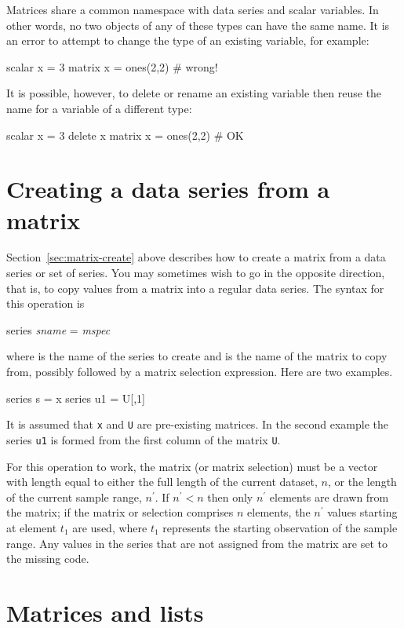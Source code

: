 Matrices share a common namespace with data series and scalar
variables.  In other words, no two objects of any of these types can
have the same name.  It is an error to attempt to change the type of
an existing variable, for example:
%
\begin{code}
scalar x = 3
matrix x = ones(2,2) # wrong!
\end{code}
%
It is possible, however, to delete or rename an existing variable then
reuse the name for a variable of a different type:
\begin{code}
scalar x = 3
delete x
matrix x = ones(2,2) # OK
\end{code}


\section{Creating a data series from a matrix}
\label{matrix-create-series}

Section~\ref{sec:matrix-create} above describes how to create a matrix
from a data series or set of series.  You may sometimes wish to go in
the opposite direction, that is, to copy values from a matrix 
into a regular data series.  The syntax for this operation is
%
\begin{textcode}
series \textsl{sname} = \textsl{mspec}
\end{textcode}
%
where  is the name of the series to create and
 is the name of the matrix to copy from, possibly followed
by a matrix selection expression.  Here are two examples.
%
\begin{code}
series s = x
series u1 = U[,1]
\end{code}
%
It is assumed that \texttt{x} and \texttt{U} are pre-existing
matrices.  In the second example the series \texttt{u1} is formed from
the first column of the matrix \texttt{U}.

For this operation to work, the matrix (or matrix selection) must be a
vector with length equal to either the full length of the current
dataset, $n$, or the length of the current sample range, $n^{\prime}$.
If $n^{\prime} < n$ then only $n^{\prime}$ elements are drawn from the
matrix; if the matrix or selection comprises $n$ elements, the
$n^{\prime}$ values starting at element $t_1$ are used, where $t_1$
represents the starting observation of the sample range.  Any values
in the series that are not assigned from the matrix are set to the
missing code.


\section{Matrices and lists}
\label{matrix-and-list}

